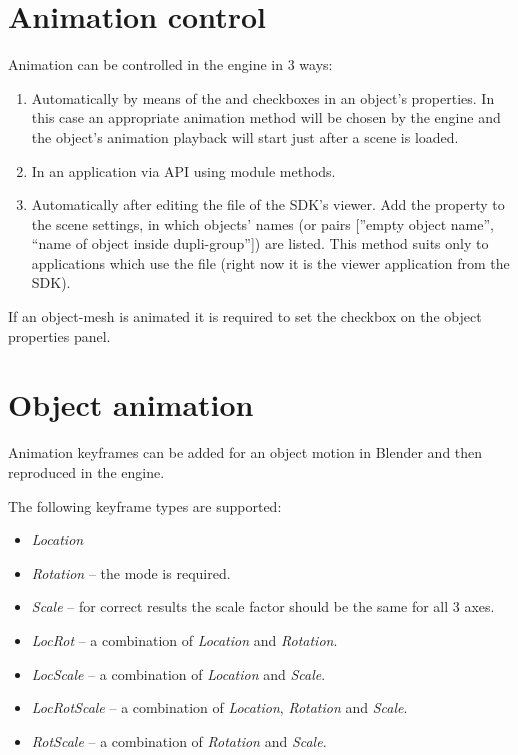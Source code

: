 \documentclass[a4paper,12pt,oneside]{sphinxmanual}
\begin{document}
\section{Animation control}
\label{animation:id2}
Animation can be controlled in the engine in 3 ways:
\begin{enumerate}
\item {} 
Automatically by means of the  and  checkboxes in an object's properties. In this case an appropriate animation method will be chosen by the engine and the object's animation playback will start just after a scene is loaded.

\item {} 
In an application via API using  module methods.

\item {} 
Automatically after editing the  file of the SDK's viewer. Add  the  property to the scene settings, in which objects' names (or pairs  {[}''empty object name'', ``name of object inside dupli-group''{]}) are listed. This method suits only to applications which use the  file (right now it is the viewer application from the SDK).

\end{enumerate}

If an object-mesh is animated it is required to set the  checkbox on the object properties panel.


\section{Object animation}
\label{animation:id3}
Animation keyframes can be added for an object motion in Blender and then reproduced in the engine.

The following keyframe types are supported:
\begin{itemize}
\item {} 
\emph{Location}

\item {} 
\emph{Rotation} -- the  mode is required.

\item {} 
\emph{Scale} -- for correct results the scale factor should be the same for all 3 axes.

\item {} 
\emph{LocRot} -- a combination of \emph{Location} and \emph{Rotation}.

\item {} 
\emph{LocScale} -- a combination of \emph{Location} and \emph{Scale}.

\item {} 
\emph{LocRotScale} -- a combination of \emph{Location}, \emph{Rotation} and \emph{Scale}.

\item {} 
\emph{RotScale} -- a combination of \emph{Rotation} and \emph{Scale}.

\end{itemize}
\end{document}

